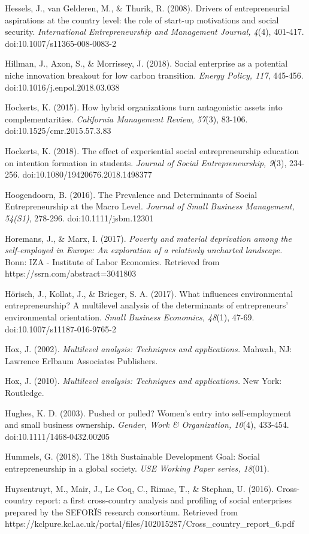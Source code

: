 \documentclass{article}
\begin{document}
Hessels, J., van Gelderen, M., \& Thurik, R. (2008). Drivers of entrepreneurial aspirations at the country level: the role of start-up motivations and social security. \emph{International Entrepreneurship and Management Journal, 4}(4), 401-417. doi:10.1007/s11365-008-0083-2 

Hillman, J., Axon, S., \& Morrissey, J. (2018). Social enterprise as a potential niche innovation breakout for low carbon transition. \emph{Energy Policy, 117}, 445-456. doi:10.1016/j.enpol.2018.03.038

Hockerts, K. (2015). How hybrid organizations turn antagonistic assets into complementarities. \emph{California Management Review, 57}(3), 83-106. doi:10.1525/cmr.2015.57.3.83

Hockerts, K. (2018). The effect of experiential social entrepreneurship education on intention formation in students. \emph{Journal of Social Entrepreneurship, 9}(3), 234-256. doi:10.1080/19420676.2018.1498377

Hoogendoorn, B. (2016). The Prevalence and Determinants of Social Entrepreneurship at the Macro Level. \emph{Journal of Small Business Management, 54(S1)}, 278-296. doi:10.1111/jsbm.12301

Horemans, J., \& Marx, I. (2017). \emph{Poverty and material deprivation among the self-employed in Europe: An exploration of a relatively uncharted landscape.} Bonn: IZA - Institute of Labor Economics. Retrieved from https://ssrn.com/abstract=3041803 

Hörisch, J., Kollat, J., \& Brieger, S. A. (2017). What influences environmental entrepreneurship? A multilevel analysis of the determinants of entrepreneurs' environmental orientation. \emph{Small Business Economics, 48}(1), 47-69. doi:10.1007/s11187-016-9765-2

Hox, J. (2002). \emph{Multilevel analysis: Techniques and applications. }Mahwah, NJ: Lawrence Erlbaum Associates Publishers.

Hox, J. (2010). \emph{Multilevel analysis: Techniques and applications. }New York: Routledge.

Hughes, K. D. (2003). Pushed or pulled? Women's entry into self-employment and small business ownership. \emph{Gender, Work \& Organization, 10}(4), 433-454. doi:10.1111/1468-0432.00205

Hummels, G. (2018). The 18th Sustainable Development Goal: Social entrepreneurship in a global society. \emph{USE Working Paper series, 18}(01). 

Huysentruyt, M., Mair, J., Le Coq, C., Rimac, T., \& Stephan, U. (2016). Cross-country report: a first cross-country analysis and profiling of social enterprises prepared by the SEFORÏS research consortium. Retrieved from https://kclpure.kcl.ac.uk/portal/files/102015287/Cross\_country\_report\_6.pdf
\end{document}
